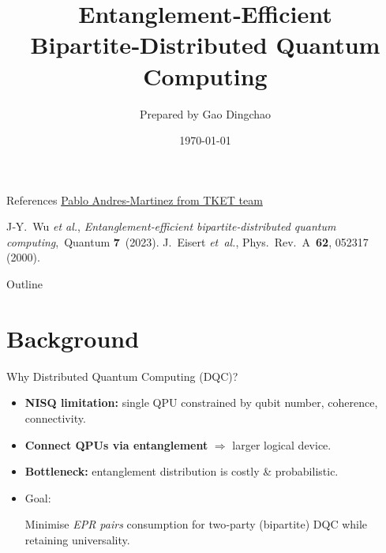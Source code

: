 \documentclass{beamer}
\title[Entanglement‑Efficient DQC]{Entanglement‑Efficient Bipartite‑Distributed Quantum Computing}
\author{Prepared by Gao Dingchao}
\institute{Reading Seminar}
\date{\today}
\begin{document}
	
	\begin{frame}[plain]
		\titlepage
	\end{frame}
	
	\begin{frame}{References}
		\footnotesize
		\href{https://pabloandrescq.github.io/}{Pablo Andres-Martinez from TKET team}
		\begin{thebibliography}{9}
			J‑Y. Wu \textit{et al.}, \emph{Entanglement‑efficient bipartite‑distributed quantum computing},\ Quantum \textbf{7} (2023).
			J. Eisert \textit{et al.}, Phys. Rev.~A \textbf{62}, 052317 (2000).
		\end{thebibliography}
	\end{frame}
	
	\begin{frame}{Outline}
		\tableofcontents
	\end{frame}
	
	\section{Background}
	
	\begin{frame}{Why Distributed Quantum Computing (DQC)?}
		\begin{itemize}
			\item \textbf{NISQ limitation:} single QPU constrained by qubit number, coherence, connectivity.
			\item \textbf{Connect QPUs via entanglement} \(\Rightarrow\) larger logical device.
			\item \textbf{Bottleneck:} entanglement distribution is costly \& probabilistic.
			\item Goal: \\[-.3em]
			\begin{block}{}
				Minimise \emph{EPR pairs} consumption for two‑party (bipartite) DQC while retaining universality.
			\end{block}
		\end{itemize}
	\end{frame}
	
\end{document}
